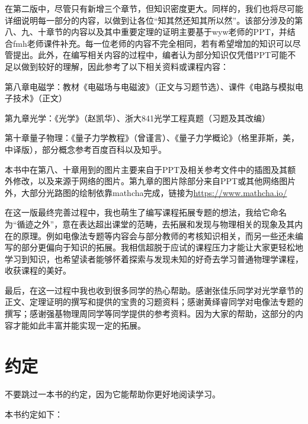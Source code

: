 在第二版中，尽管只有新增三个章节，但知识密度更大。同样的，我们也将尽可能详细说明每一部分的内容，以做到让各位“知其然还知其所以然”。该部分涉及的第八、九、十章节的内容以及其中重要定理的证明主要基于wyw老师的PPT，并结合fmh老师课件补充。每一位老师的内容不完全相同，若有希望增加的知识可以尽管提出。此外，在编写相关内容的过程中，编者认为部分知识仅凭借PPT可能不足以做到较好的理解，因此参考了以下相关资料或课程内容：
\begin{Itemize}
    \item 第八章电磁学：教材《电磁场与电磁波》（正文与习题节选）、课件《电路与模拟电子技术》（正文）
    \item 第九章光学：《光学》（赵凯华）、浙大841光学工程真题（习题及其改编）
    \item 第十章量子物理：《量子力学教程》（曾谨言）、《量子力学概论》（格里菲斯，美，中译版），部分概念参考百度百科以及知乎。
\end{Itemize}

本书中在第八、十章用到的图片主要来自于PPT及相关参考文件中的插图及其额外修改，以及来源于网络的图片。第九章的图片除部分来自PPT或其他网络图片外，大部分光路图的绘制依靠mathcha完成，链接为\url{https://www.mathcha.io/}

在这一版最终完善过程中，我也萌生了编写课程拓展专题的想法，我给它命名为“循迹之外”，意在表达超出课堂的范畴，去拓展和发现与物理相关的现象及其内在的原理。例如电像法专题等内容会与部分教师的考核知识相关，而另一些还未编写的部分更偏向于知识的拓展。我相信超脱于应试的课程压力才能让大家更轻松地学习到知识，也希望读者能够怀着探索与发现未知的好奇去学习普通物理学课程，收获课程的美好。

最后，在这一过程中我也收到很多同学的热心帮助。感谢张佳乐同学对光学章节的正文、定理证明的撰写和提供的宝贵的习题资料；感谢黄绎睿同学对电像法专题的撰写；感谢强基物理周同学等同学提供的参考资料。因为大家的帮助，这部分的内容才能如此丰富并能实现一定的拓展。

\chapter{约定}
不要跳过一本书的约定，因为它能帮助你更好地阅读学习。

本书约定如下：
\setcounter{chapter}{-1}

